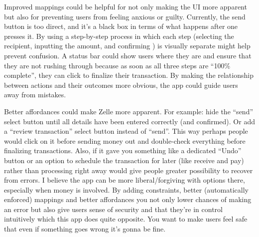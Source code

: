 \documentclass[
	letterpaper, %
]{jdf}
\begin{document}
Improved mappings could be helpful for not only making the UI more apparent but also for preventing users from feeling anxious or guilty. Currently, the send button is too direct, and it’s a black box in terms of what happens after one presses it. By using a step-by-step process in which each step (selecting the recipient, inputting the amount, and confirming ) is visually separate might help prevent confusion. A status bar could show users where they are and ensure that they are not rushing through because as soon as all three steps are “100\% complete”, they can click to finalize their transaction. By making the relationship between actions and their outcomes more obvious, the app could guide users away from mistakes.

Better affordances could make Zelle more apparent. For example: hide the “send” select button until all details have been entered correctly (and confirmed). Or add a “review transaction” select button instead of “send”. This way perhaps people would click on it before sending money out and double-check everything before finalizing transactions. Also, if it gave you something like a dedicated “Undo” button or an option to schedule the transaction for later (like receive and pay) rather than processing right away would give people greater possibility to recover from errors. I believe the app can be more liberal/forgiving with options there, especially when money is involved. By adding constraints, better (automatically enforced) mappings and better affordances you not only lower chances of making an error but also give users sense of security and that they’re in control intuitively which this app does quite opposite. You want to make users feel safe that even if something goes wrong it’s gonna be fine.


\newpage
\end{document}
